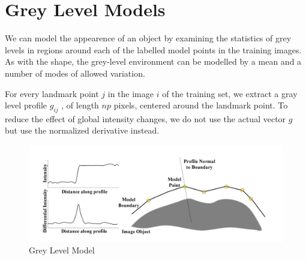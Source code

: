 \section{Grey Level Models}
We can model the appearence of an object by examining
the statistics of grey levels in regions around each
of the labelled model points in the training images.
As with the shape, the grey-level environment can be
modelled by a mean and a number of modes of allowed variation.

For every landmark point $j$ in the image $i$ of the
training set, we extract a gray level profile $g_{ij}$ , of length
$np$ pixels, centered around the landmark point.
To reduce the effect of global intensity changes, we do not use
the actual vector $g$ but use the normalized derivative instead.

\begin{figure}
  \centering
  \includegraphics[width=\linewidth]{img/grey-level}
  \caption{Grey Level Model}
\end{figure}